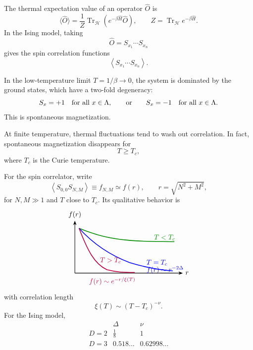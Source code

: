 The thermal expectation value of an operator \(\hat O\) is
\[
  \langle\hat O\rangle
  =
  \frac{1}{Z}\operatorname{Tr}_{\mathcal H}
  \left(e^{-\beta\hat H}\hat O\right),
  \qquad
  Z=\operatorname{Tr}_{\mathcal H}e^{-\beta\hat H}.
\]
In the Ising model, taking
\[
  \hat O=S_{x_1}\cdots S_{x_n}
\]
gives the spin correlation functions
\[
  \left\langle S_{x_1}\cdots S_{x_n}\right\rangle.
\]

In the low-temperature limit \(T=1/\beta\to0\), the system is dominated by
the ground states, which have a two-fold degeneracy:
\[
  S_x=+1\quad\hbox{for all }x\in\Lambda,
  \qquad
  \hbox{or}\qquad
  S_x=-1\quad\hbox{for all }x\in\Lambda.
\]
This is spontaneous magnetization.

At finite temperature, thermal fluctuations tend to wash out correlation.
In fact, spontaneous magnetization disappears for
\[
  T\geq T_c,
\]
where \(T_c\) is the Curie temperature.

For the spin correlator, write
\[
  \left\langle S_{0,0}S_{N,M}\right\rangle
  \equiv f_{N,M}\simeq f(r),
  \qquad
  r=\sqrt{N^2+M^2},
\]
for \(N,M\gg1\) and \(T\) close to \(T_c\).  Its qualitative behavior is
\[
\begin{tikzpicture}[>=Stealth,scale=0.86,baseline=(current bounding box.center)]
  \draw[->,line width=0.75pt] (0,0) -- (6.4,0) node[right] {\(r\)};
  \draw[->,line width=0.75pt] (0,0) -- (0,3.1) node[above] {\(f(r)\)};
  \draw[green!55!black,line width=1.15pt]
    (0.25,2.65) .. controls (1.25,2.25) and (2.0,2.05) .. (3.1,1.95)
    .. controls (4.2,1.84) and (5.0,1.88) .. (5.9,1.86);
  \draw[blue,line width=1.15pt]
    (0.25,2.65) .. controls (1.1,1.72) and (2.1,1.05) .. (3.25,0.62)
    .. controls (4.3,0.30) and (5.15,0.18) .. (5.8,0.13);
  \draw[purple,line width=1.15pt]
    (0.25,2.65) .. controls (0.75,1.35) and (1.15,0.55) .. (1.9,0.2)
    .. controls (2.45,0.05) and (2.95,0.04) .. (3.55,0.04);
  \node[green!55!black,anchor=west] at (4.55,2.1) {\(T<T_c\)};
  \node[blue,anchor=west] at (4.1,0.62) {\(T=T_c\)};
  \node[purple,anchor=west] at (1.35,0.75) {\(T>T_c\)};
  \node[blue,anchor=west] at (4.1,0.2) {\(f(r)\sim r^{-2\Delta}\)};
  \node[purple,anchor=west] at (0.7,-0.48)
    {\(f(r)\sim e^{-r/\xi(T)}\)};
\end{tikzpicture}
\]
with correlation length
\[
  \xi(T)\sim (T-T_c)^{-\nu}.
\]
For the Ising model,
\[
\begin{array}{c|cc}
  & \Delta & \nu
\\ \hline
  D=2 & \frac18 & 1
\\
  D=3 & 0.518\ldots & 0.62998\ldots
\end{array}
\]

